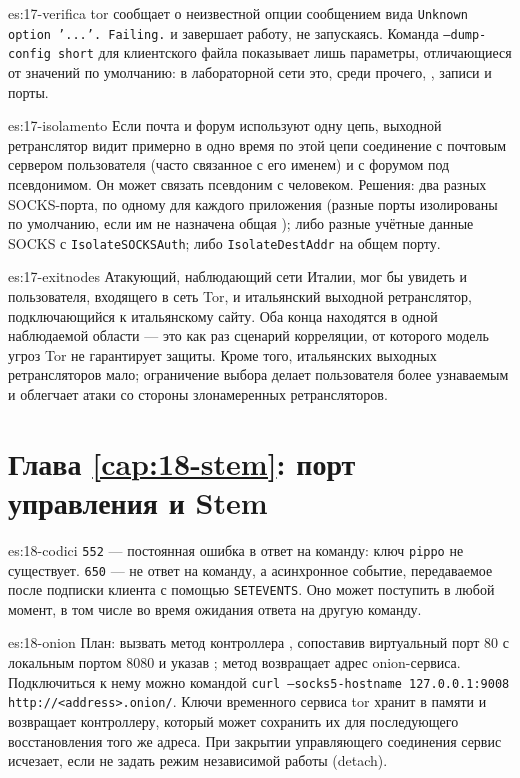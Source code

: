 \begin{soluzione}{es:17-verifica}
tor сообщает о неизвестной опции сообщением вида \texttt{Unknown option '...'. Failing.} и завершает работу, не запускаясь. Команда \texttt{--dump-config short} для клиентского файла  показывает лишь параметры, отличающиеся от значений по умолчанию: в лабораторной сети это, среди прочего, , записи  и порты.
\end{soluzione}

\begin{soluzione}{es:17-isolamento}
Если почта и форум используют одну цепь, выходной ретранслятор видит примерно в одно время по этой цепи соединение с почтовым сервером пользователя (часто связанное с его именем) и с форумом под псевдонимом. Он может связать псевдоним с человеком. Решения: два разных SOCKS-порта, по одному для каждого приложения (разные порты изолированы по умолчанию, если им не назначена общая ); либо разные учётные данные SOCKS с \texttt{IsolateSOCKSAuth}; либо \texttt{IsolateDestAddr} на общем порту.
\end{soluzione}

\begin{soluzione}{es:17-exitnodes}
Атакующий, наблюдающий сети Италии, мог бы увидеть и пользователя, входящего в сеть Tor, и итальянский выходной ретранслятор, подключающийся к итальянскому сайту. Оба конца находятся в одной наблюдаемой области — это как раз сценарий корреляции, от которого модель угроз Tor не гарантирует защиты. Кроме того, итальянских выходных ретрансляторов мало; ограничение выбора делает пользователя более узнаваемым и облегчает атаки со стороны злонамеренных ретрансляторов.
\end{soluzione}

\section*{Глава \ref{cap:18-stem}: порт управления и Stem}

\begin{soluzione}{es:18-codici}
\texttt{552} — постоянная ошибка в ответ на команду: ключ \texttt{pippo} не существует. \texttt{650} — не ответ на команду, а асинхронное событие, передаваемое после подписки клиента с помощью \texttt{SETEVENTS}. Оно может поступить в любой момент, в том числе во время ожидания ответа на другую команду.
\end{soluzione}

\begin{soluzione}{es:18-onion}
План: вызвать метод контроллера , сопоставив виртуальный порт 80 с локальным портом 8080 и указав ; метод возвращает адрес onion-сервиса. Подключиться к нему можно командой \texttt{curl --socks5-hostname 127.0.0.1:9008 http://<address>.onion/}. Ключи временного сервиса tor хранит в памяти и возвращает контроллеру, который может сохранить их для последующего восстановления того же адреса. При закрытии управляющего соединения сервис исчезает, если не задать режим независимой работы (detach).
\end{soluzione}

